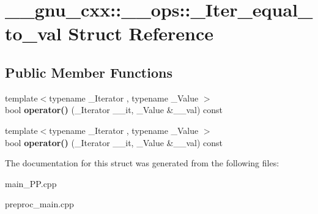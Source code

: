 \hypertarget{struct____gnu__cxx_1_1____ops_1_1__Iter__equal__to__val}{\section{\+\_\+\+\_\+gnu\+\_\+cxx\+:\+:\+\_\+\+\_\+ops\+:\+:\+\_\+\+Iter\+\_\+equal\+\_\+to\+\_\+val Struct Reference}
\label{struct____gnu__cxx_1_1____ops_1_1__Iter__equal__to__val}
}
\subsection*{Public Member Functions}
\begin{DoxyCompactItemize}
\item 
\hypertarget{struct____gnu__cxx_1_1____ops_1_1__Iter__equal__to__val_ac55911fc1e2e0f6343c4b6bb4bcc3057}{{\footnotesize template$<$typename \+\_\+\+Iterator , typename \+\_\+\+Value $>$ }\\bool {\bfseries operator()} (\+\_\+\+Iterator \+\_\+\+\_\+it, \+\_\+\+Value \&\+\_\+\+\_\+val) const }\label{struct____gnu__cxx_1_1____ops_1_1__Iter__equal__to__val_ac55911fc1e2e0f6343c4b6bb4bcc3057}

\item 
\hypertarget{struct____gnu__cxx_1_1____ops_1_1__Iter__equal__to__val_ac55911fc1e2e0f6343c4b6bb4bcc3057}{{\footnotesize template$<$typename \+\_\+\+Iterator , typename \+\_\+\+Value $>$ }\\bool {\bfseries operator()} (\+\_\+\+Iterator \+\_\+\+\_\+it, \+\_\+\+Value \&\+\_\+\+\_\+val) const }\label{struct____gnu__cxx_1_1____ops_1_1__Iter__equal__to__val_ac55911fc1e2e0f6343c4b6bb4bcc3057}

\end{DoxyCompactItemize}


The documentation for this struct was generated from the following files\+:\begin{DoxyCompactItemize}
\item 
main\+\_\+\+P\+P.\+cpp\item 
preproc\+\_\+main.\+cpp\end{DoxyCompactItemize}
